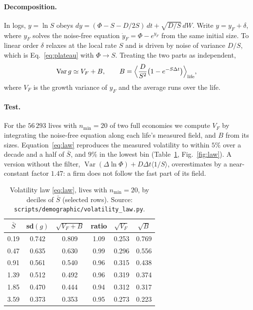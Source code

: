 \documentclass[pre,twocolumn,superscriptaddress,nofootinbib]{revtex4-2}
\newcommand{\Var}{\operatorname{Var}}
\newcommand{\Sb}{\bar S}
\begin{document}
\paragraph{Decomposition.}  In logs, $y=\ln S$ obeys
$dy=(\Phi-S-D/2S)\,dt+\sqrt{D/S}\,dW$.  Write $y=y_F+\delta$, where $y_F$ solves the noise-free equation
$\dot y_F=\Phi-e^{y_F}$ from the same initial size.  To linear order $\delta$ relaxes at the local rate
$S$ and is driven by noise of variance $D/S$, which is Eq.~\eqref{eq:plateau} with $\Phi\to S$.
Treating the two parts as independent,
\begin{equation}
\Var g\simeq V_F+B,\qquad B=\Big\langle\frac{D}{S^2}\big(1-e^{-S\Delta t}\big)\Big\rangle_{\rm life},
\label{eq:law}
\end{equation}
where $V_F$ is the growth variance of $y_F$ and the average runs over the life.

\paragraph{Test.}  For the $56\,293$ lives with $n_{\min}=20$ of two full economies we compute $V_F$
by integrating the noise-free equation along each life's measured field, and $B$ from its sizes.
Equation~\eqref{eq:law} reproduces the measured volatility to within $5\%$ over a decade and a
half of $\Sb$, and $9\%$ in the lowest bin (Table~\ref{tab:law}, Fig.~\ref{fig:law}).  A version
without the filter, $\Var(\Delta\ln\Phi)+D\Delta t\langle1/S\rangle$, overestimates by a near-constant factor
$1.47$: a firm does not follow the fast part of its field.

\begin{table}[b]
\caption{Volatility law \eqref{eq:law}, lives with $n_{\min}=20$, by deciles of $\Sb$
(selected rows).  Source: \texttt{scripts/demographic/volatility\_law.py}.}
\label{tab:law}
\begin{ruledtabular}
\begin{tabular}{cccccc}
$\Sb$ & sd$(g)$ & $\sqrt{V_F+B}$ & ratio & $\sqrt{V_F}$ & $\sqrt B$\\
\hline
0.19 & 0.742 & 0.809 & 1.09 & 0.253 & 0.769\\
0.47 & 0.635 & 0.630 & 0.99 & 0.296 & 0.556\\
0.91 & 0.561 & 0.540 & 0.96 & 0.315 & 0.438\\
1.39 & 0.512 & 0.492 & 0.96 & 0.319 & 0.374\\
1.85 & 0.470 & 0.444 & 0.94 & 0.312 & 0.317\\
3.59 & 0.373 & 0.353 & 0.95 & 0.273 & 0.223\\
\end{tabular}
\end{ruledtabular}
\end{table}
\end{document}
